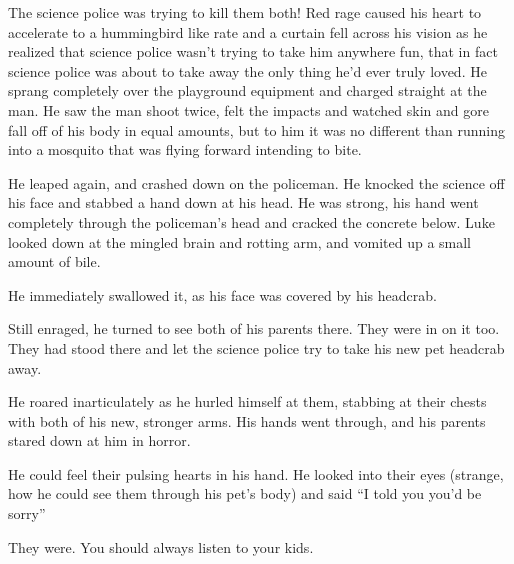 The science police was trying to kill them both! Red rage caused
his heart to accelerate to a hummingbird like rate and a curtain
fell across his vision as he realized that science police wasn't
trying to take him anywhere fun, that in fact science police was
about to take away the only thing he'd ever truly loved. He sprang
completely over the playground equipment and charged straight at
the man. He saw the man shoot twice, felt the impacts and watched
skin and gore fall off of his body in equal amounts, but to him it
was no different than running into a mosquito that was flying
forward intending to bite.



He leaped again, and crashed down on the policeman. He knocked the
science off his face and stabbed a hand down at his head. He was
strong, his hand went completely through the policeman's head and
cracked the concrete below. Luke looked down at the mingled brain
and rotting arm, and vomited up a small amount of bile.



He immediately swallowed it, as his face was covered by his
headcrab.



Still enraged, he turned to see both of his parents there. They
were in on it too. They had stood there and let the science police
try to take his new pet headcrab away.



He roared inarticulately as he hurled himself at them, stabbing at
their chests with both of his new, stronger arms. His hands went
through, and his parents stared down at him in horror.



He could feel their pulsing hearts in his hand. He looked into
their eyes (strange, how he could see them through his pet's body)
and said ``I told you you'd be sorry''



They were. You should always listen to your kids. 

 



